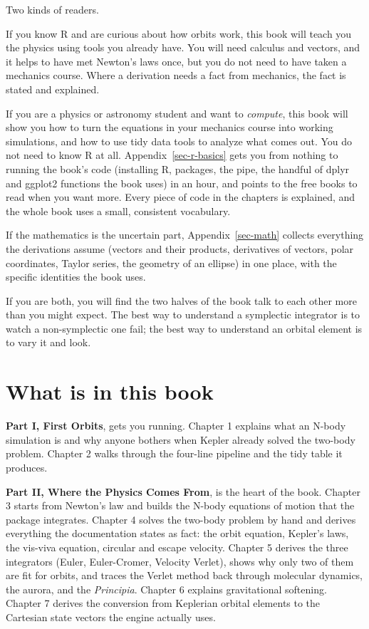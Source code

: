 \documentclass[
  10.5pt,
  letterpaper,
]{scrbook}
\theoremstyle{definition}
\theoremstyle{plain}
\theoremstyle{remark}
\begin{document}

Two kinds of readers.

If you know R and are curious about how orbits work, this book will
teach you the physics using tools you already have. You will need
calculus and vectors, and it helps to have met Newton's laws once, but
you do not need to have taken a mechanics course. Where a derivation
needs a fact from mechanics, the fact is stated and explained.

If you are a physics or astronomy student and want to \emph{compute},
this book will show you how to turn the equations in your mechanics
course into working simulations, and how to use tidy data tools to
analyze what comes out. You do not need to know R at all.
Appendix~\ref{sec-r-basics} gets you from nothing to running the book's
code (installing R, packages, the pipe, the handful of dplyr and ggplot2
functions the book uses) in an hour, and points to the free books to
read when you want more. Every piece of code in the chapters is
explained, and the whole book uses a small, consistent vocabulary.

If the mathematics is the uncertain part, Appendix~\ref{sec-math}
collects everything the derivations assume (vectors and their products,
derivatives of vectors, polar coordinates, Taylor series, the geometry
of an ellipse) in one place, with the specific identities the book uses.

If you are both, you will find the two halves of the book talk to each
other more than you might expect. The best way to understand a
symplectic integrator is to watch a non-symplectic one fail; the best
way to understand an orbital element is to vary it and look.

\section*{What is in this book}\label{what-is-in-this-book}


\textbf{Part I, First Orbits}, gets you running. Chapter 1 explains what
an N-body simulation is and why anyone bothers when Kepler already
solved the two-body problem. Chapter 2 walks through the four-line
pipeline and the tidy table it produces.

\textbf{Part II, Where the Physics Comes From}, is the heart of the
book. Chapter 3 starts from Newton's law and builds the N-body equations
of motion that the package integrates. Chapter 4 solves the two-body
problem by hand and derives everything the documentation states as fact:
the orbit equation, Kepler's laws, the vis-viva equation, circular and
escape velocity. Chapter 5 derives the three integrators (Euler,
Euler-Cromer, Velocity Verlet), shows why only two of them are fit for
orbits, and traces the Verlet method back through molecular dynamics,
the aurora, and the \emph{Principia}. Chapter 6 explains gravitational
softening. Chapter 7 derives the conversion from Keplerian orbital
elements to the Cartesian state vectors the engine actually uses.
\end{document}
